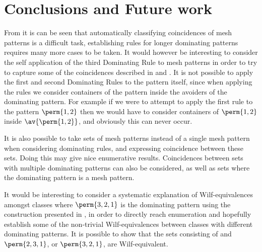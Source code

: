 \chapter{Conclusions and Future work}
From  it is can be seen that automatically classifying
coincidences of mesh patterns is a difficult task, establishing rules for longer
dominating patterns requires many more cases to be taken. It would however
be interesting to consider the self application of the  third Dominating Rule to mesh
patterns in order to try to capture some of the coincidences described in
\textcite{DBLP:journals/combinatorics/HilmarssonJSVU15} and \textcite{journals/combinatorics/BrandenC11}.
It is not possible to apply the first and second Dominating Rules to the pattern
itself, since when applying the rules we consider containers of the pattern inside
the avoiders of the dominating pattern. For example if we were to attempt to apply
the first rule to the pattern \(\perm{1,2}\) then we would have to consider
containers of \(\perm{1,2}\) inside \(\av{\perm{1,2}}\), and obviously this can
never occur.

It is also possible to take sets of mesh patterns instead of a single mesh pattern
when considering dominating rules, and expressing coincidence between these sets.
Doing this may give nice enumerative results. Coincidences between sets with
multiple dominating patterns can also be considered, as well as sets where the
dominating pattern is a mesh pattern.

It would be interesting to consider a systematic explanation of Wilf-equivalences
amongst classes where \(\perm{3,2,1}\) is the dominating pattern using the
construction presented in \cite[Sec.~12]{2015arXiv151203226B}, in order to directly
reach enumeration and hopefully establish some of the non-trivial Wilf-equivalences
between classes with different dominating patterns. It is possible to show that
the sets consisting of  and
\(\perm{2,3,1}\), or \(\perm{3,2,1}\), are Wilf-equivalent.
